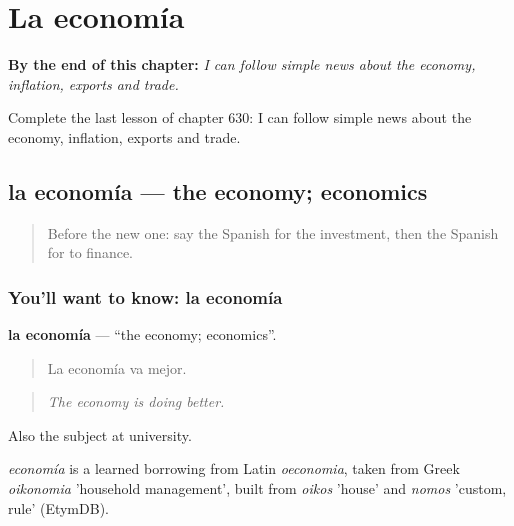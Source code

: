 
\chapter{La economía}
\label{ch:es-la-economia}

\begin{chapteropening}
\textbf{By the end of this chapter:} \emph{I can follow simple news about the economy, inflation, exports and trade.}

Complete the last lesson of chapter 630: I can follow simple news about the economy, inflation, exports and trade.
\end{chapteropening}

\section[la economía]{la economía — the economy; economics}

\label{lesson:ES-C630-economia}



\begin{quote}
Before the new one: say the Spanish for the investment, then the Spanish for to finance.
\end{quote}

\subsection*{You'll want to know: la economía}
\textbf{la economía} — \textquotedblleft{}the economy; economics\textquotedblright{}.

\begin{quote}
La economía va mejor.
\end{quote}

\begin{quote}
\emph{The economy is doing better.}
\end{quote}

Also the subject at university.

\begin{cousinweb}
\emph{economía} is a learned borrowing from Latin \emph{oeconomia}, taken from Greek \emph{oikonomia} 'household management', built from \emph{oikos} 'house' and \emph{nomos} 'custom, rule' (EtymDB).
\end{cousinweb}

